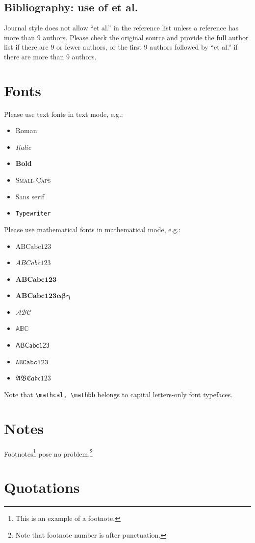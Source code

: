 \documentclass[aihp]{imsart}
\theoremstyle{plain}
\theoremstyle{definition}
\begin{document}
\subsection{Bibliography: use of et al.}
Journal style does not allow ``et al.'' in the reference list unless a reference
has more than 9 authors. Please check the original source and provide the full
author list if there are 9 or fewer authors, or the first 9 authors followed by
``et al.'' if there are more than 9 authors.

\section{Fonts}
Please use text fonts in text mode, e.g.:
\begin{itemize}
\item[]\textrm{Roman}
\item[]\textit{Italic}
\item[]\textbf{Bold}
\item[]\textsc{Small Caps}
\item[]\textsf{Sans serif}
\item[]\texttt{Typewriter}
\end{itemize}
Please use mathematical fonts in mathematical mode, e.g.:
\begin{itemize}
\item[] $\mathrm{ABCabc123}$
\item[] $\mathit{ABCabc123}$
\item[] $\mathbf{ABCabc123}$
\item[] $\boldsymbol{ABCabc123\alpha\beta\gamma}$
\item[] $\mathcal{ABC}$
\item[] $\mathbb{ABC}$
\item[] $\mathsf{ABCabc123}$
\item[] $\mathtt{ABCabc123}$
\item[] $\mathfrak{ABCabc123}$
\end{itemize}
Note that \verb|\mathcal, \mathbb| belongs to capital letters-only font typefaces.

\section{Notes}
Footnotes\footnote{This is an example of a footnote.}
pose no problem.\footnote{Note that footnote number is after punctuation.}

\section{Quotations}
\end{document}
